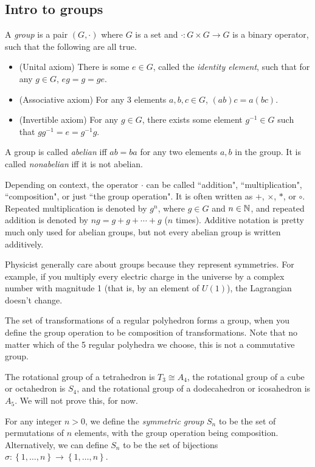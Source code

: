 \documentclass[class=article, crop=false]{standalone}
\begin{document}
\subsection{Intro to groups}
A \emph{group} is a pair $(G, \cdot)$ where $G$ is a set and $\cdot: G \times G \rightarrow G$ is a binary operator, such that the following are all true.
\begin{itemize}
    \item (Unital axiom) There is some $e \in G$, called the \emph{identity element}, such that for any $g \in G$, $eg=g=ge$.
    \item (Associative axiom) For any 3 elements $a,b,c \in G$, $(ab)c=a(bc)$.
    \item (Invertible axiom) For any $g \in G$, there exists some element $g^{-1} \in G$ such that $g g^{-1}=e=g^{-1}g$.
\end{itemize}
\par
A group is called \emph{abelian} iff $ab=ba$ for any two elements $a,b$ in the group. It is called \emph{nonabelian} iff it is not abelian.
\begin{note}
    Depending on context, the operator $\cdot$ can be called ``addition", ``multiplication", ``composition", or just ``the group operation". It is often written as $+$, $\times$, $*$, or $\circ$. Repeated multiplication is denoted by $g^n$, where $g \in G$ and $n \in \mathbb{N}$, and repeated addition is denoted by $ng=g+g+\cdots +g$ ($n$ times). Additive notation is pretty much only used for abelian groups, but not every abelian group is written additively.
\end{note}
Physicist generally care about groups because they represent symmetries. For example, if you multiply every electric charge in the universe by a complex number with magnitude 1 (that is, by an element of $U(1)$), the Lagrangian doesn't change.
\begin{example}
    The set of transformations of a regular polyhedron forms a group, when you define the group operation to be composition of transformations. Note that no matter which of the 5 regular polyhedra we choose, this is not a commutative group.
\end{example}
\begin{prop}
    The rotational group of a tetrahedron is $T_3\cong A_4$, the rotational group of a cube or octahedron is $S_4$, and the rotational group of a dodecahedron or icosahedron is $A_5$. We will not prove this, for now.
\end{prop}
For any integer $n > 0$, we define the \emph{symmetric group} $S_n$ to be the set of permutations of $n$ elements, with the group operation being composition. Alternatively, we can define $S_n$ to be the set of bijections $\sigma: \left\{ 1, \dots, n \right\} \rightarrow \left\{ 1, \dots, n \right\}$.
\end{document}
